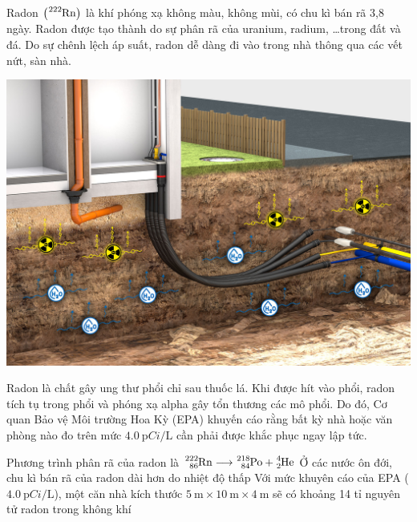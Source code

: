 \begin{ex}
	Radon $\left(\ce{^{222}Rn}\right)$ là khí phóng xạ không màu, không mùi, có chu kì bán rã 3,8 ngày. Radon được tạo thành do sự phân rã của uranium, radium, \dots trong đất và đá. Do sự chênh lệch áp suất, radon dễ dàng đi vào trong nhà thông qua các vết nứt, sàn nhà. 
	\begin{center}
		\includegraphics[width=0.4\linewidth]{figs/VN12-Y24-PH-SYL-032P-2}
	\end{center}
	Radon là chất gây ung thư phổi chỉ sau thuốc lá. Khi được hít vào phổi, radon tích tụ trong phổi và phóng xạ alpha gây tổn thương các mô phổi. Do đó, Cơ quan Bảo vệ Môi trường Hoa Kỳ (EPA) khuyến cáo rằng bất kỳ nhà hoặc văn phòng nào đo trên mức $\SI{4.0}{\pico Ci/\liter}$ cần phải được khắc phục ngay lập tức.
	
	{\True Phương trình phân rã của radon là $\ce{^{222}_{86}Rn}\longrightarrow \ce{^{218}_{84}Po}+\ce{^4_2He}$}
	{Ở các nước ôn đới, chu kì bán rã của radon dài hơn do nhiệt độ thấp}
	{\True Với mức khuyên cáo của EPA ($\SI{4.0}{\pico Ci/\liter}$), một căn nhà kích thước $\SI{5}{\meter}\times \SI{10}{\meter}\times \SI{4}{\meter}$ sẽ có khoảng 14 tỉ nguyên tử radon trong không khí}
\end{ex}
